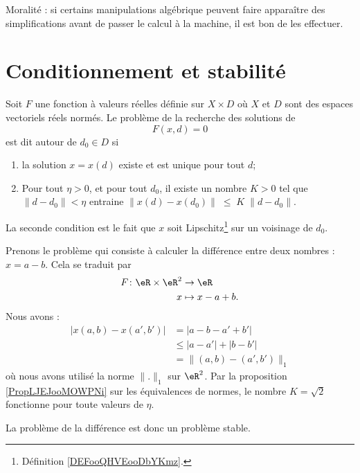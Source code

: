 Moralité : si certains manipulations algébrique peuvent faire apparaître des simplifications avant de passer le calcul à la machine, il est bon de les effectuer.

\section{Conditionnement et stabilité}

\begin{definition}      \label{DEFooYIFAooSJbMkC}
	Soit $F$ une fonction à valeurs réelles définie sur $X\times D$ où $X$ et $D$ sont des espaces vectoriels réels normés. Le problème de la recherche des solutions de
	\begin{equation}
		F(x,d)=0
	\end{equation}
	est dit  autour de \( d_0\in D\) si
	\begin{enumerate}
		\item
			la solution $x=x(d)$ existe et est unique pour tout $d$;
		\item \label{ItemProbStableB}
			Pour tout $\eta>0$, et pour tout $d_0$, il existe un nombre $K>0$ tel que $\| d-d_0\|<\eta$ entraine $\|x(d)-x(d_0)\|\;\leq\;K\;\|d-d_0\|$.
	\end{enumerate}
    La seconde condition est le fait que \( x\) soit Lipschitz\footnote{Définition \ref{DEFooQHVEooDbYKmz}.} sur un voisinage de \( d_0\).
\end{definition}

\begin{example}    \label{ExooXJONooTAYZVc}
    Prenons le problème qui consiste à calculer la différence entre deux nombres : \( x=a-b\). Cela se traduit par
    \begin{equation}
        \begin{aligned}
            F\colon \eR\times \eR^2&\to \eR \\
            x&\mapsto x-a+b. 
        \end{aligned}
    \end{equation}
    Nous avons : 
    \begin{subequations}
        \begin{align}
            \big| x(a,b)-x(a',b') \big|&=| a-b-a'+b' |\\
            &\leq| a-a' |+| b-b' |\\
            &=\|  (a,b)-(a',b')  \|_1
        \end{align}
    \end{subequations}
    où nous avons utilisé la norme \( \| . \|_1\) sur \( \eR^2\). Par la proposition \ref{PropLJEJooMOWPNi} sur les équivalences de normes, le nombre \( K=\sqrt{2}\) fonctionne pour toute valeurs de \( \eta\).

    La problème de la différence est donc un problème stable.
\end{example}

